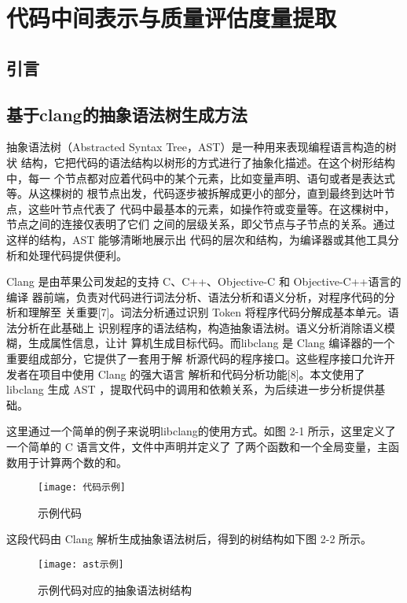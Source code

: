 
\chapter{代码中间表示与质量评估度量提取}

\section{引言}

\section{基于clang的抽象语法树生成方法}
抽象语法树（Abstracted Syntax Tree，AST）是一种用来表现编程语言构造的树状
结构，它把代码的语法结构以树形的方式进行了抽象化描述。在这个树形结构中，每一
个节点都对应着代码中的某个元素，比如变量声明、语句或者是表达式等。从这棵树的
根节点出发，代码逐步被拆解成更小的部分，直到最终到达叶节点，这些叶节点代表了
代码中最基本的元素，如操作符或变量等。在这棵树中，节点之间的连接仅表明了它们
之间的层级关系，即父节点与子节点的关系。通过这样的结构，AST 能够清晰地展示出
代码的层次和结构，为编译器或其他工具分析和处理代码提供便利。


Clang 是由苹果公司发起的支持 C、C++、Objective-C 和 Objective-C++语言的编译
器前端，负责对代码进行词法分析、语法分析和语义分析，对程序代码的分析和理解至
关重要[7]。词法分析通过识别 Token 将程序代码分解成基本单元。语法分析在此基础上
识别程序的语法结构，构造抽象语法树。语义分析消除语义模糊，生成属性信息，让计
算机生成目标代码。而libclang 是 Clang 编译器的一个重要组成部分，它提供了一套用于解
析源代码的程序接口。这些程序接口允许开发者在项目中使用 Clang 的强大语言
解析和代码分析功能[8]。本文使用了libclang 生成
AST ，提取代码中的调用和依赖关系，为后续进一步分析提供基础。


这里通过一个简单的例子来说明libclang的使用方式。如图 2-1 所示，这里定义了一个简单的 C 语言文件，文件中声明并定义了
了两个函数和一个全局变量，主函数用于计算两个数的和。
\begin{figure}[h]
\centering
\texttt{[image: 代码示例]}
\caption{示例代码}
\end{figure}
这段代码由 Clang 解析生成抽象语法树后，得到的树结构如下图 2-2 所示。
\begin{figure}[h]
\centering
\texttt{[image: ast示例]}
\caption{示例代码对应的抽象语法树结构}
\end{figure}

